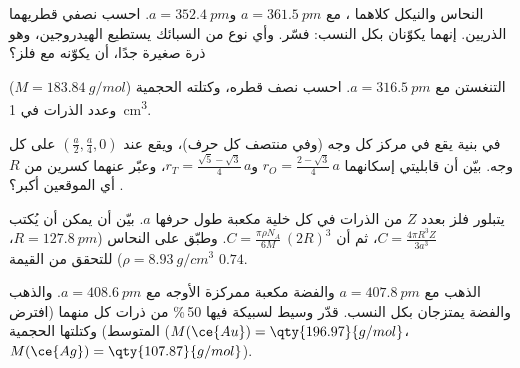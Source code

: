 \begin{exercise}[$\star\star$]\label{exo:b1:crystals-metals:8}
النحاس والنيكل كلاهما ، مع $a = \qty{361.5}{pm}$
و$a = \qty{352.4}{pm}$. احسب نصفي قطريهما الذريين. إنهما يكوّنان
 بكل النسب: فسّر. وأي نوع من السبائك يستطيع
الهيدروجين، وهو ذرة صغيرة جدًا، أن يكوّنه مع فلز؟
\end{exercise}

\begin{exercise}[$\star\star$]\label{exo:b1:crystals-metals:9}
التنغستن  مع $a = \qty{316.5}{pm}$. احسب نصف قطره،
وكتلته الحجمية ($M = \qty{183.84}{g/mol}$) وعدد الذرات في
\qty{1}{cm^3}.
\end{exercise}

\begin{exercise}[$\star\star\star$]\label{exo:b1:crystals-metals:10}
في بنية  يقع  في مركز كل وجه
(وفي منتصف كل حرف)، ويقع  عند
$(\frac{a}{2}, \frac{a}{4}, 0)$ على كل وجه. بيّن أن
قابليتي إسكانهما $r_O = \frac{2 - \sqrt3}{4}\,a$
و$r_T = \frac{\sqrt5 - \sqrt3}{4}\,a$، وعبّر عنهما كسرين من
$R$. أي الموقعين أكبر؟
\end{exercise}

\begin{exercise}[$\star\star\star$]\label{exo:b1:crystals-metals:11}
يتبلور فلز بعدد $Z$ من الذرات في كل خلية مكعبة طول حرفها $a$. بيّن أن
 يمكن أن يُكتب $C = \frac{4\pi R^3 Z}{3a^3}$، ثم أن
$C = \frac{\pi\rho N_A}{6M}\,(2R)^3$. وطبّق على النحاس ($R = \qty{127.8}{pm}$،
$\rho = \qty{8.93}{g/cm^3}$) للتحقق من القيمة $0.74$.
\end{exercise}

\begin{exercise}[$\star\star\star$]\label{exo:b1:crystals-metals:12}
الذهب  مع $a = \qty{407.8}{pm}$ والفضة مكعبة ممركزة الأوجه مع
$a = \qty{408.6}{pm}$. والذهب والفضة يمتزجان بكل النسب. قدّر
وسيط  لسبيكة فيها 50\,\% من ذرات كل منهما (افترض
المتوسط) وكتلتها الحجمية ($M(\ce{Au}) = \qty{196.97}{g/mol}$،
$M(\ce{Ag}) = \qty{107.87}{g/mol}$).
\end{exercise}

